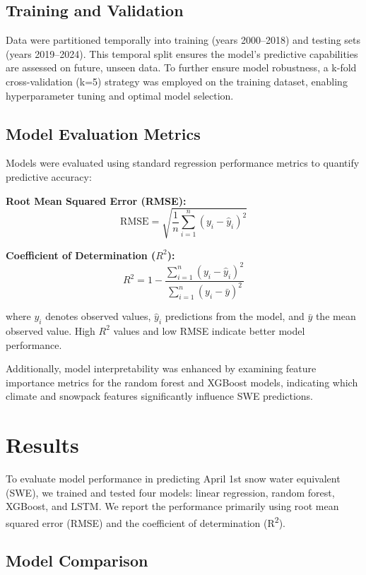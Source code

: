 \documentclass{article}
\begin{document}
\subsection{Training and Validation}

Data were partitioned temporally into training (years 2000--2018) and testing sets (years 2019--2024). This temporal split ensures the model's predictive capabilities are assessed on future, unseen data. To further ensure model robustness, a k-fold cross-validation (k=5) strategy was employed on the training dataset, enabling hyperparameter tuning and optimal model selection.

\subsection{Model Evaluation Metrics}

Models were evaluated using standard regression performance metrics to quantify predictive accuracy:

\textbf{Root Mean Squared Error (RMSE):}
\[
\text{RMSE} = \sqrt{\frac{1}{n}\sum_{i=1}^{n}(y_i - \hat{y}_i)^2}
\]

\textbf{Coefficient of Determination ($R^2$):}
\[
R^2 = 1 - \frac{\sum_{i=1}^{n}(y_i - \hat{y}_i)^2}{\sum_{i=1}^{n}(y_i - \bar{y})^2}
\]

where $y_i$ denotes observed values, $\hat{y}_i$ predictions from the model, and $\bar{y}$ the mean observed value. High $R^2$ values and low RMSE indicate better model performance.

Additionally, model interpretability was enhanced by examining feature importance metrics for the random forest and XGBoost models, indicating which climate and snowpack features significantly influence SWE predictions.

\section{Results}

To evaluate model performance in predicting April 1st snow water equivalent (SWE), we trained and tested four models: linear regression, random forest, XGBoost, and LSTM. We report the performance primarily using root mean squared error (RMSE) and the coefficient of determination (R\textsuperscript{2}).

\subsection{Model Comparison}
\end{document}
